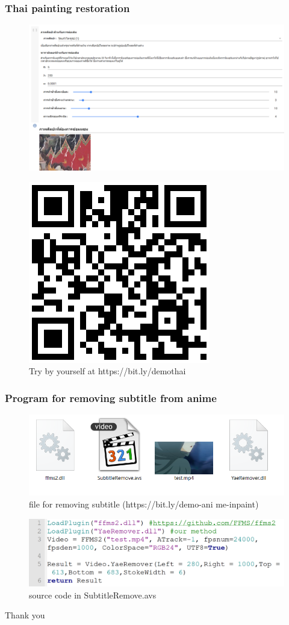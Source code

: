 \documentclass[xcolor=dvipsnames, xetex,serif]{beamer}
\begin{document}
    \begin{frame}
        \frametitle{Thai painting restoration}
        \centering
        \begin{figure}[H]
            \centering
            \includegraphics[width=0.7\linewidth]{images/colab_sample.png}
        \end{figure}
        \begin{figure}[H]
            \centering
            \includegraphics[width=0.1\linewidth]{images/colab_qr.png}
            \caption{Try by yourself at https://bit.ly/demothai}
        \end{figure}
    \end{frame}
    \begin{frame}
		\frametitle{Program for removing subtitle from anime}
		\begin{figure}
			\includegraphics[width=0.8\linewidth]{images/demo_anime/file.png}
			\caption{file for removing subtitle (https://bit.ly/demo-ani me-inpaint)}
		\end{figure}
		\begin{figure}
			\includegraphics[width=0.8\linewidth]{images/demo_anime/notepad.png}
			\caption{source code in SubtitleRemove.avs}
		\end{figure}
	\end{frame}
    \begin{frame}
        \centering
        \Huge{Thank you}
    \end{frame}
\end{document}
